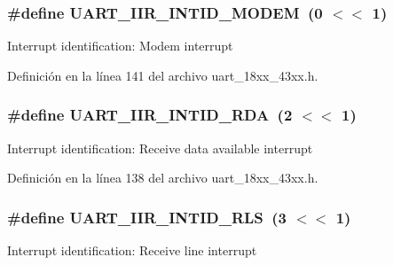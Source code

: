 \subsubsection[{\texorpdfstring{U\+A\+R\+T\+\_\+\+I\+I\+R\+\_\+\+I\+N\+T\+I\+D\+\_\+\+M\+O\+D\+EM}{UART_IIR_INTID_MODEM}}]{\setlength{\rightskip}{0pt plus 5cm}\#define U\+A\+R\+T\+\_\+\+I\+I\+R\+\_\+\+I\+N\+T\+I\+D\+\_\+\+M\+O\+D\+EM~(0 $<$$<$ 1)}\hypertarget{group___u_a_r_t__18_x_x__43_x_x_gaf02dabd5f0b60345c70379ab8df3e899}{}\label{group___u_a_r_t__18_x_x__43_x_x_gaf02dabd5f0b60345c70379ab8df3e899}
Interrupt identification\+: Modem interrupt 

Definición en la línea 141 del archivo uart\+\_\+18xx\+\_\+43xx.\+h.

\subsubsection[{\texorpdfstring{U\+A\+R\+T\+\_\+\+I\+I\+R\+\_\+\+I\+N\+T\+I\+D\+\_\+\+R\+DA}{UART_IIR_INTID_RDA}}]{\setlength{\rightskip}{0pt plus 5cm}\#define U\+A\+R\+T\+\_\+\+I\+I\+R\+\_\+\+I\+N\+T\+I\+D\+\_\+\+R\+DA~(2 $<$$<$ 1)}\hypertarget{group___u_a_r_t__18_x_x__43_x_x_gac646d8f797f3e71e01f4361997fc581b}{}\label{group___u_a_r_t__18_x_x__43_x_x_gac646d8f797f3e71e01f4361997fc581b}
Interrupt identification\+: Receive data available interrupt 

Definición en la línea 138 del archivo uart\+\_\+18xx\+\_\+43xx.\+h.

\subsubsection[{\texorpdfstring{U\+A\+R\+T\+\_\+\+I\+I\+R\+\_\+\+I\+N\+T\+I\+D\+\_\+\+R\+LS}{UART_IIR_INTID_RLS}}]{\setlength{\rightskip}{0pt plus 5cm}\#define U\+A\+R\+T\+\_\+\+I\+I\+R\+\_\+\+I\+N\+T\+I\+D\+\_\+\+R\+LS~(3 $<$$<$ 1)}\hypertarget{group___u_a_r_t__18_x_x__43_x_x_ga4441660d2a99f6b17a79eafbfb0424dd}{}\label{group___u_a_r_t__18_x_x__43_x_x_ga4441660d2a99f6b17a79eafbfb0424dd}
Interrupt identification\+: Receive line interrupt 

